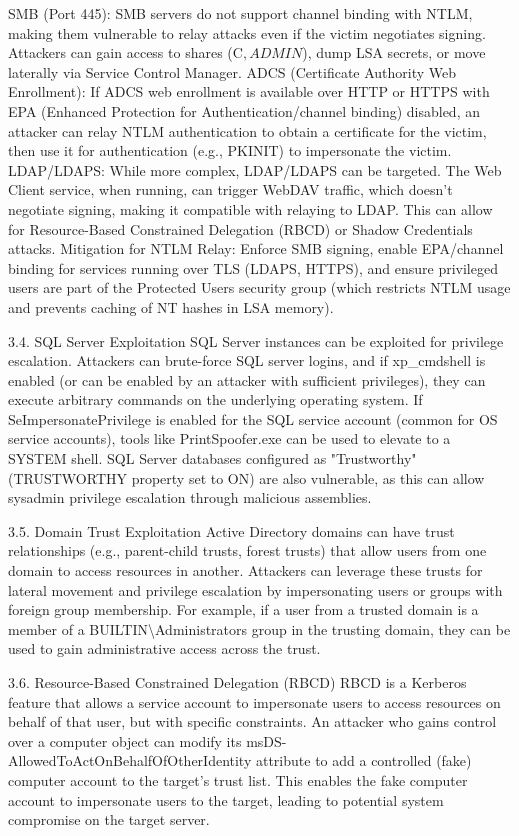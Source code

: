 SMB (Port 445): SMB servers do not support channel binding with NTLM, making them vulnerable to relay attacks even if the victim negotiates signing. Attackers can gain access to shares (C$, ADMIN$), dump LSA secrets, or move laterally via Service Control Manager.
ADCS (Certificate Authority Web Enrollment): If ADCS web enrollment is available over HTTP or HTTPS with EPA (Enhanced Protection for Authentication/channel binding) disabled, an attacker can relay NTLM authentication to obtain a certificate for the victim, then use it for authentication (e.g., PKINIT) to impersonate the victim.
LDAP/LDAPS: While more complex, LDAP/LDAPS can be targeted. The Web Client service, when running, can trigger WebDAV traffic, which doesn't negotiate signing, making it compatible with relaying to LDAP. This can allow for Resource-Based Constrained Delegation (RBCD) or Shadow Credentials attacks.
Mitigation for NTLM Relay: Enforce SMB signing, enable EPA/channel binding for services running over TLS (LDAPS, HTTPS), and ensure privileged users are part of the Protected Users security group (which restricts NTLM usage and prevents caching of NT hashes in LSA memory).

3.4. SQL Server Exploitation
SQL Server instances can be exploited for privilege escalation. Attackers can brute-force SQL server logins, and if xp\_cmdshell is enabled (or can be enabled by an attacker with sufficient privileges), they can execute arbitrary commands on the underlying operating system. If SeImpersonatePrivilege is enabled for the SQL service account (common for OS service accounts), tools like PrintSpoofer.exe can be used to elevate to a SYSTEM shell. SQL Server databases configured as "Trustworthy" (TRUSTWORTHY property set to ON) are also vulnerable, as this can allow sysadmin privilege escalation through malicious assemblies.

3.5. Domain Trust Exploitation
Active Directory domains can have trust relationships (e.g., parent-child trusts, forest trusts) that allow users from one domain to access resources in another. Attackers can leverage these trusts for lateral movement and privilege escalation by impersonating users or groups with foreign group membership. For example, if a user from a trusted domain is a member of a BUILTIN\textbackslash{}Administrators group in the trusting domain, they can be used to gain administrative access across the trust.

3.6. Resource-Based Constrained Delegation (RBCD)
RBCD is a Kerberos feature that allows a service account to impersonate users to access resources on behalf of that user, but with specific constraints. An attacker who gains control over a computer object can modify its msDS-AllowedToActOnBehalfOfOtherIdentity attribute to add a controlled (fake) computer account to the target's trust list. This enables the fake computer account to impersonate users to the target, leading to potential system compromise on the target server.

